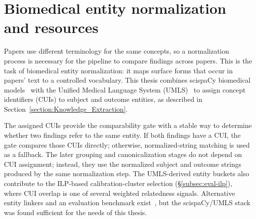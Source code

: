 \section{Biomedical entity normalization and resources}\label{section:background-biomedical-entity-normalization-and-resources}

Papers use different terminology for the same concepts, so a normalization process is necessary for the pipeline to compare findings across papers. This is the task of biomedical entity normalization: it maps surface forms that occur in papers' text to a controlled vocabulary. This thesis combines scispaCy biomedical models~\parencite{neumann2019scispacy} with the Unified Medical Language System (UMLS)~\parencite{bodenreider2004umls} to assign concept identifiers (CUIs) to subject and outcome entities, as described in Section~\ref{section:Knowledge_Extraction}.

The assigned CUIs provide the comparability gate with a stable way to determine whether two findings refer to the same entity. If both findings have a CUI, the gate compares those CUIs directly; otherwise, normalized-string matching is used as a fallback. The later grouping and canonicalization stages do not depend on CUI assignment; instead, they use the normalized subject and outcome strings produced by the same normalization step. The UMLS-derived entity buckets also contribute to the ILP-based calibration-cluster selection (§\ref{subsec:eval-ilp}), where CUI overlap is one of several weighted relatedness signals. Alternative entity linkers and an evaluation benchmark exist~\parencite{agarwal2022entitylinkingexplicit, oshima2024syntheticcontextllm}, but the scispaCy/UMLS stack was found sufficient for the needs of this thesis. 